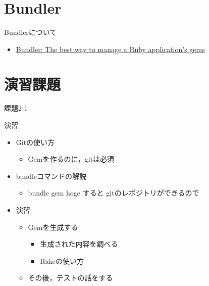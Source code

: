 \documentclass[t, aspectratio=169]{beamer}
\begin{document}
\section{Bundler}
\label{sec-2-2}
\begin{frame}[label=sec-2-2-1]{Bundlerについて}
\begin{itemize}
\item \href{http://bundler.io/}{Bundler: The best way to manage a Ruby application's gems}
\end{itemize}
\end{frame}
\section{演習課題}
\label{sec-2-3}
\begin{frame}[label=sec-2-3-1]{課題2-1}
\begin{block}{演習}
\begin{itemize}
\item Gitの使い方
\begin{itemize}
\item Gemを作るのに，gitは必須
\end{itemize}

\item bundleコマンドの解説
\begin{itemize}
\item bundle gem hoge すると gitのレポジトリができるので
\end{itemize}
\item 演習
\begin{itemize}
\item Gemを生成する
\begin{itemize}
\item 生成された内容を調べる
\item Rakeの使い方
\end{itemize}
\item その後，テストの話をする
\end{itemize}
\end{itemize}
\end{block}
\end{frame}
\end{document}
